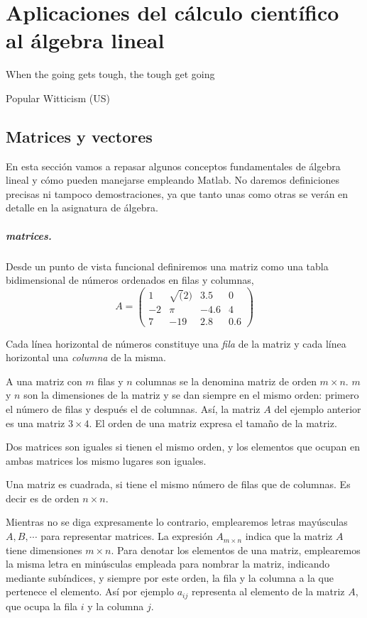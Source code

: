 \chapter{Aplicaciones del cálculo científico al álgebra lineal}
\epigraph{When the going gets tough, the tough get going}{Popular Witticism (US)}
\section{Matrices y vectores}
En esta sección vamos a repasar algunos conceptos fundamentales de  álgebra lineal y cómo pueden manejarse empleando Matlab. No daremos definiciones precisas ni tampoco demostraciones, ya que tanto unas como otras se verán en detalle en la asignatura de álgebra. 
\paragraph{matrices.} Desde un punto de vista funcional definiremos una matriz como una tabla bidimensional de números ordenados en filas y columnas,
\begin{equation*}
A=
\begin{pmatrix}
1& \sqrt(2)& 3.5& 0\\
-2& \pi& -4.6& 4\\
7& -19& 2.8& 0.6
\end{pmatrix}
\end{equation*}

Cada línea horizontal de números constituye una \emph{fila} de la matriz y cada línea horizontal una \emph{columna} de la misma.

A una matriz con $m$ filas y $n$ columnas se la denomina matriz de orden $m\times n$. $m$ y $n$ son la dimensiones de la matriz y se dan siempre en el mismo orden: primero el número de filas y después el de columnas. Así, la matriz $A$ del ejemplo anterior es una matriz $3\times 4$. El orden de una matriz expresa el tamaño de la matriz.

Dos matrices son iguales si tienen el mismo orden, y los elementos que ocupan en ambas matrices los mismo lugares son iguales.

Una matriz es cuadrada, si tiene el mismo número de filas que de columnas. Es decir es de orden $n\times n$.

Mientras no se diga expresamente lo contrario, emplearemos letras mayúsculas $A, B, \cdots$ para representar matrices. La expresión $A_{m\times n}$ indica que la matriz $A$ tiene dimensiones $m \times n$. Para denotar los elementos de una matriz, emplearemos la misma letra en minúsculas empleada para nombrar la matriz, indicando mediante subíndices, y siempre por este orden, la fila y la columna a la que pertenece el elemento. Así por ejemplo $a_{ij}$ representa al elemento de la matriz $A$, que ocupa la fila $i$ y la columna $j$.

